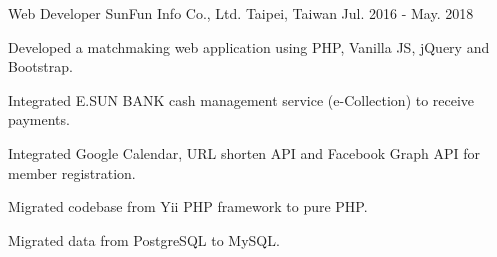 \begin{cventries}
  \cventry
    {Web Developer} %
    {SunFun Info Co., Ltd.} %
    {Taipei, Taiwan} %
    {Jul. 2016 - May. 2018} %
    {
      \begin{cvitems} %
        \item {Developed a matchmaking web application using PHP, Vanilla JS, jQuery and Bootstrap.}
        \item {Integrated E.SUN BANK cash management service (e-Collection) to receive payments.}
        \item {Integrated Google Calendar, URL shorten API and Facebook Graph API for member registration.}
        \item {Migrated codebase from Yii PHP framework to pure PHP.}
        \item {Migrated data from PostgreSQL to MySQL.}
      \end{cvitems}
    }

\end{cventries}
